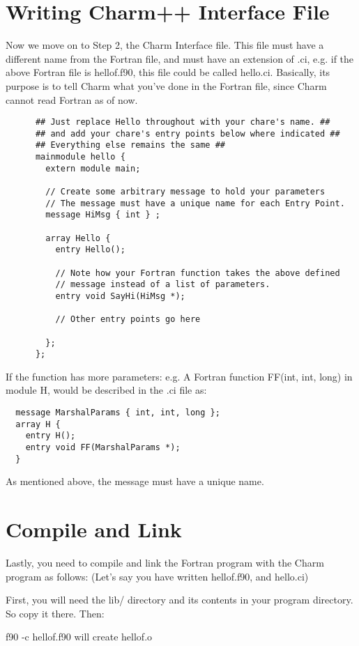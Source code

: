 \documentclass[11pt]{article}
\begin{document}
\section{Writing Charm++ Interface File}
Now we move on to Step 2, the Charm Interface file.  This file must
have a different name from the Fortran file, and must have an
extension of .ci, e.g. if the above Fortran file is hellof.f90, this
file could be called hello.ci.  Basically, its purpose is to tell
Charm what you've done in the Fortran file, since Charm cannot read
Fortran as of now.
\begin{verbatim}
      ## Just replace Hello throughout with your chare's name. ##
      ## and add your chare's entry points below where indicated ##
      ## Everything else remains the same ##
      mainmodule hello {
        extern module main;
      
        // Create some arbitrary message to hold your parameters
        // The message must have a unique name for each Entry Point.
        message HiMsg { int } ;
      
        array Hello {
          entry Hello();

          // Note how your Fortran function takes the above defined
          // message instead of a list of parameters.
          entry void SayHi(HiMsg *);

          // Other entry points go here

        };              
      };
\end{verbatim}
If the function has more parameters: e.g. A Fortran function FF(int,
int, long) in module H, would be described in the .ci file as:
\begin{verbatim}
  message MarshalParams { int, int, long };
  array H {
    entry H();
    entry void FF(MarshalParams *);
  }
\end{verbatim}
As mentioned above, the message must have a unique name.

\section{Compile and Link}
Lastly, you need to compile and link the Fortran program with the
Charm program as follows: (Let's say you have written hellof.f90, and
hello.ci)

  First, you will need the lib/ directory and its contents in your
  program directory.  So copy it there.  Then:

  f90 -c hellof.f90
    will create hellof.o
\end{document}
